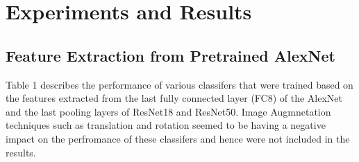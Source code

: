\documentclass[doc/report.tex]{subfiles}
\begin{document}
\section{Experiments and Results}
\subsection{Feature Extraction from Pretrained AlexNet}
Table 1 describes the performance of various classifers that were trained based on the features extracted from the last fully connected layer (FC8) of the AlexNet and the last pooling layers of ResNet18 and ResNet50. Image Augmnetation techniques such as translation and rotation seemed to be having a negative impact on the perfromance of these classifers and hence were not included in the results.

\begin{table}[]
\centering
\caption{Accuracy of various trained classifers}
\label{tab:my-table1}
\end{table}
\end{document}
